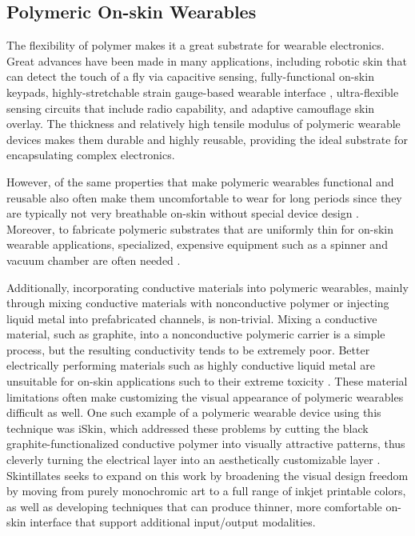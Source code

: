 \documentclass{sigchi}
\begin{document}
\subsection{Polymeric On-skin Wearables}
The flexibility of polymer makes it a great substrate for wearable electronics. Great advances have been made in many applications, including robotic skin that can detect the touch of a fly via capacitive sensing\cite{Mannsfeld:2010is}, fully-functional on-skin keypads\cite{Anonymous:L82kTfjJ}, highly-stretchable strain gauge-based wearable interface \cite{Boley:2014dr,Muth:2014bv}, ultra-flexible sensing circuits that include radio capability\cite{Jang:1gb,Anonymous:BBKIC9BZ}, and adaptive camouflage skin overlay\cite{Yu:2014ht}. The thickness and relatively high tensile modulus of polymeric wearable devices makes them durable and highly reusable, providing the ideal substrate for encapsulating complex electronics.

However, of the same properties that make polymeric wearables functional and reusable also often make them uncomfortable to wear for long periods since they are typically not very breathable on-skin without special device design \cite{Jang:1gb}. Moreover, to fabricate polymeric substrates that are uniformly thin for on-skin wearable applications, specialized, expensive equipment such as a spinner and vacuum chamber are often needed \cite{Son:2014iya,Yu:2014ht,Anonymous:BBKIC9BZ,Jang:1gb,Muth:2014bv,Anonymous:L82kTfjJ}. 

Additionally, incorporating conductive materials into polymeric wearables, mainly through mixing conductive materials with nonconductive polymer or injecting liquid metal into prefabricated channels, is non-trivial. Mixing a conductive material, such as graphite, into a nonconductive polymeric carrier is a simple process, but the resulting conductivity tends  to  be  extremely poor\cite{Weigel:2015fh,Frutiger:2015fm}. Better electrically performing materials such as highly conductive liquid  metal  are unsuitable for on-skin applications such to their extreme toxicity \cite{Boley:2014dr}. These material limitations often make customizing the visual appearance of polymeric wearables difficult as well. One such example of a polymeric wearable device using this technique was iSkin, which addressed these problems by cutting the black graphite-functionalized conductive polymer into visually attractive patterns, thus cleverly turning the electrical layer into an aesthetically customizable layer \cite{Weigel:2015fh}. Skintillates seeks to expand on this work by broadening the visual design freedom by moving from purely monochromic art to a full range of inkjet printable colors, as well as developing techniques that can produce thinner, more comfortable on-skin interface that support additional input/output modalities. 
\end{document}
